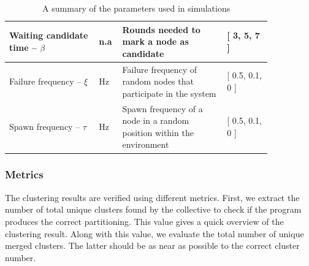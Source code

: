 \begin{table}[t]
{\begin{tabular}{|p{0.30\linewidth}|p{0.05\linewidth}|p{0.35\linewidth}|p{0.15\linewidth}|}
      Waiting candidate time -- $\beta$  &  n.a                                             & Rounds needed to mark a node as candidate                                                                                       & {[} 3, 5, 7 {]}       \\ \hline
      Failure frequency      -- $\xi$    &  \unit{\hertz}                                   & Failure frequency of random nodes that participate in the system                                                                                       & {[} 0.5, 0.1, 0 {]}    \\ \hline
      Spawn frequency        -- $\tau$   &  \unit{\hertz}                                   & Spawn frequency of a node in a random position within the environment                                                                           & {[} 0.5, 0.1, 0 {]}    \\ \hline
    \end{tabular}
  }
  \caption{A summary of the parameters used in simulations}
  \label{table:parameters}
\end{table}

\subsubsection{Metrics}

The clustering results are verified using different metrics. First,
 we extract the number of total unique clusters found by the collective
 to check if the program produces the correct partitioning.
%
This value gives a quick overview of the clustering result. 
Along with this value, we
 evaluate the total number of unique merged clusters.
 The latter should be as near as possible to the correct cluster number.

